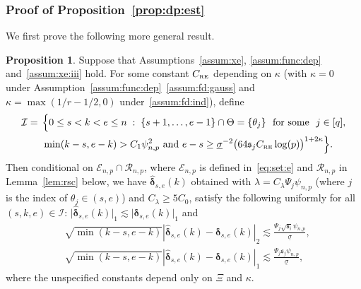 \documentclass[11pt, a4paper]{article}
\newcommand{\mc}{\mathcal}
\renewcommand{\l}{\left}
\renewcommand{\r}{\right}
\def\wh{\widehat}
\newcommand{\cp}{\theta}
\newcommand{\Cp}{\Theta}
\newcommand{\crsc}{C_{\text{\tiny \upshape RE}}}
\theoremstyle{definition}
\theoremstyle{definition}
\theoremstyle{definition}
\theoremstyle{definition}
\newtheorem{prop}[thm]{Proposition}
\theoremstyle{definition}
\theoremstyle{remark}
\theoremstyle{definition}
\theoremstyle{definition}
\theoremstyle{definition}
\begin{document}
\subsubsection{Proof of Proposition~\ref{prop:dp:est}}
\label{pf:prop:lasso}

We first prove the following more general result.

\begin{prop}
	\label{prop:lasso}
	Suppose that Assumptions~\ref{assum:xe}, \ref{assum:func:dep}  and~\ref{assum:xe:iii} hold.
	For some constant $\crsc$ depending on $\kappa$ (with $\kappa = 0$ under Assumption~\ref{assum:func:dep}~\ref{assum:fd:gauss} and $\kappa = \max(1/r - 1/2, 0)$ under~\ref{assum:fd:ind}), define
	\begin{multline*}
	\mc I = \, \Bigl\{0 \le s < k < e \le n\; : \; \{s + 1, \ldots, e - 1\} \cap \Cp = \{ \cp_j \} \text{ \ for some \ } j \in [q],
	\\ 
	\quad  \min(k - s, e - k) > C_1\psi_{n, p}^2 \text{ and } e - s \ge \underline{\sigma}^{-2}\bigl(64 \mathfrak{s}_j \crsc \log(p) \bigr)^{1 + 2\kappa}
	\Bigr\}.
	\end{multline*}
	Then conditional on $\mc E_{n, p} \cap \mc R_{n, p}$, where $\mc E_{n, p}$ is defined in~\eqref{eq:set:e} and $\mc R_{n, p}$ in Lemma~\ref{lem:rsc} below, we have $\wh{\bm\delta}_{s, e}(k)$ obtained with $\lambda = C_\lambda \Psi_j \psi_{n, p}$ (where $j$ is the index of $\cp_j \in (s, e)$) and $C_\lambda \ge 5 C_0$, satisfy the following uniformly for all $(s, k, e) \in \mc I$: $\vert \wh{\bm\delta}_{s, e}(k) \vert_1 \lesssim \vert \bm\delta_{s, e}(k) \vert_1$ and
	\begin{align*}
	& 
 \sqrt{\min(k - s, e - k)} \l\vert \wh{\bm\delta}_{s, e}(k) - \bm\delta_{s, e}(k) \r\vert_2 \lesssim \frac{\Psi_j \sqrt{\mathfrak{s_j}} \psi_{n, p}}{\underline{\sigma}}, 
	\\
	&  
 \sqrt{\min(k - s, e - k)} \l\vert \wh{\bm\delta}_{s, e}(k) - \bm\delta_{s, e}(k) \r\vert_1 \lesssim \frac{\Psi_j \mathfrak{s}_j \psi_{n, p}}{\underline{\sigma}},
	\end{align*}
	where the unspecified constants depend only on $\Xi$ and $\kappa$.
\end{prop}
\end{document}
